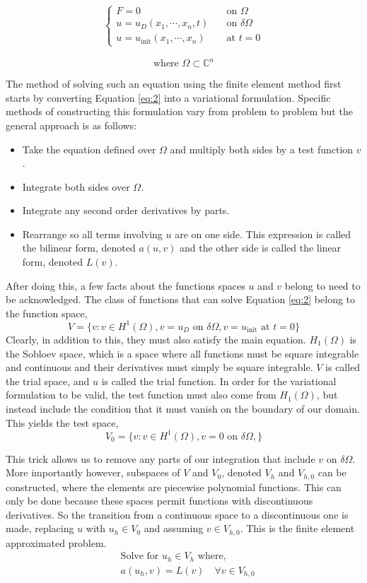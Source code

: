 \begin{align}
\begin{cases} 
F=0 \quad &\text{on } \Omega \\
u = u_D(x_1, \cdots, x_n, t) \quad &\text{on } \delta\Omega \label{eq:2} \\
u = u_{\text{init}}(x_1, \cdots, x_n) \quad &\text{at } t=0
\end{cases}
\end{align}

$$
\text{where } \Omega \subset \mathbb{C}^n
$$

The method of solving such an equation using the finite element method first starts by converting Equation \ref{eq:2} into a variational formulation. Specific methods of constructing this formulation vary from problem to problem but the general approach is as follows:

\begin{itemize}
    \item Take the equation defined over $\Omega$ and multiply both sides by a test function $v$.
    \item Integrate both sides over $\Omega$.
    \item Integrate any second order derivatives by parts.
    \item Rearrange so all terms involving $u$ are on one side. This expression is called the bilinear form, denoted $a(u,v)$ and the other side is called the linear form, denoted $L(v)$.
\end{itemize}

After doing this, a few facts about the functions spaces $u$ and $v$ belong to need to be acknowledged. The class of functions that can solve Equation \ref{eq:2} belong to the function space,
$$V=\{ v : v \in H^1(\Omega), v=u_D \text{ on } \delta\Omega, v=u_\text{init} \text{ at } t=0 \}$$
Clearly, in addition to this, they must also satisfy the main equation. $H_1(\Omega)$ is the Sobloev space, which is a space where all functions must be square integrable and continuous and their derivatives must simply be square integrable. $V$ is called the trial space, and $u$ is called the trial function. In order for the variational formulation to be valid, the test function must also come from $H_1(\Omega)$, but instead include the condition that it must vanish on the boundary of our domain. This yields the test space,
$$V_0 = \{ v : v \in H^1(\Omega), v=0 \text{ on } \delta\Omega, \}$$

This trick allows us to remove any parts of our integration that include $v$ on $\delta\Omega$. More importantly however, subspaces of $V$ and $V_0$, denoted $V_h$ and $V_{h,0}$ can be constructed, where the elements are piecewise polynomial functions. This can only be done because these spaces permit functions with discontinuous derivatives. So the transition from a continuous space to a discontinuous one is made, replacing $u$ with $u_h \in V_0$ and assuming $v \in V_{h,0}$. This is the finite element approximated problem.
\begin{align}
&\text{Solve for $u_h \in V_h$ where,} \nonumber \\
&a(u_h,v) = L(v) \quad \forall v \in V_{h,0} \label{eq:3}
\end{align}

